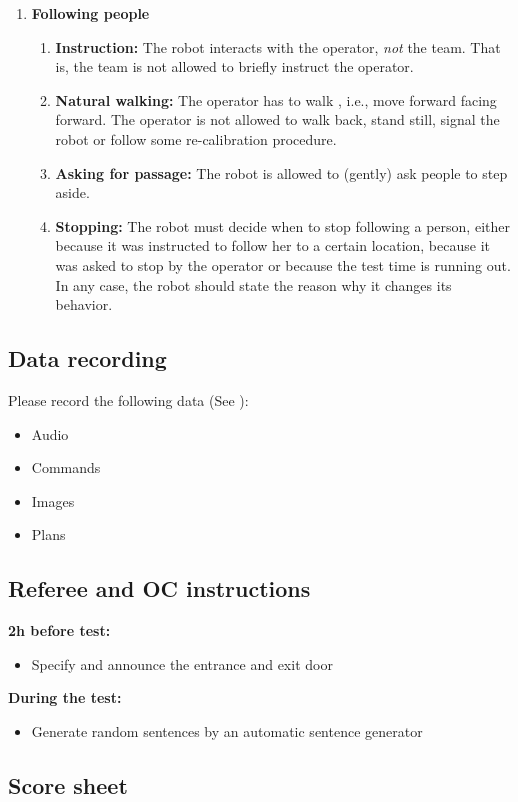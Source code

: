 \begin{enumerate}
\begin{enumerate}
	\end{enumerate}
	\item \textbf{Following people} 
	\begin{enumerate}
		\item \textbf{Instruction:} The robot interacts with the operator, \emph{not} the team. That is, the team is not allowed to briefly instruct the operator.
		\item \textbf{Natural walking:} The operator has to walk , i.e., move forward facing forward. The operator is not allowed to walk back, stand still, signal the robot or follow some re-calibration procedure.
		\item \textbf{Asking for passage:} The robot is allowed to (gently) ask people to step aside.
		\item \textbf{Stopping:} The robot must decide when to stop following a person, either because it was instructed to follow her to a certain location, because it was asked to stop by the operator or because the test time is running out. In any case, the robot should state the reason why it changes its behavior.
	\end{enumerate}
\end{enumerate}

\subsection{Data recording}
  Please record the following data (See ):
  \begin{itemize}
   \item Audio
   \item Commands
   \item Images
   \item Plans
  \end{itemize}


\subsection{Referee and OC instructions}
\textbf{2h before test:}
\begin{itemize}
\item Specify and announce the entrance and exit door
\end{itemize}
\textbf{During the test:}
\begin{itemize}
\item Generate random sentences by an automatic sentence generator
\end{itemize}

\newpage
\subsection{Score sheet}


